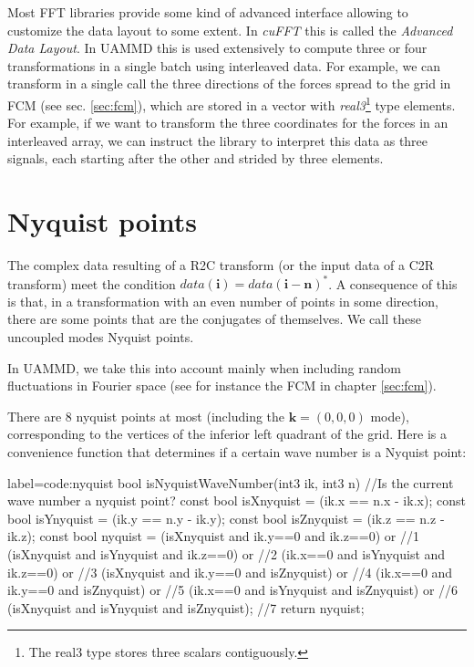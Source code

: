 \documentclass[twoside,openright,titlepage,numbers=noenddot,%
headinclude,footinclude,cleardoublepage=empty,abstract=on,
BCOR=5mm,fontsize=11pt, dvipsnames, paper=b5
]{scrreprt}
\renewcommand{\vec}[1]{\bm{#1}}
\newcommand{\uammd}{\gls{UAMMD}\xspace}
\begin{document}
Most \gls{FFT} libraries provide some kind of advanced interface allowing to customize the data layout to some extent. In \emph{cuFFT} this is called the \emph{Advanced Data Layout}. In \uammd this is used extensively to compute three or four transformations in a single batch using interleaved data. For example, we can transform in a single call the three directions of the forces spread to the grid in \gls{FCM} (see sec. \ref{sec:fcm}), which are stored in a vector with \emph{real3}\footnote{The real3 type stores three scalars contiguously.} type elements.
For example, if we want to transform the three coordinates for the forces in an interleaved array, we can instruct the library to interpret this data as three signals, each starting after the other and strided by three elements.
\section*{Nyquist points}
The complex data resulting of a R2C transform (or the input data of a C2R transform) meet the condition $data(\vec{i}) = data(\vec{i} - \vec{n})^*$. A consequence of this is that, in a transformation with an even number of points in some direction, there are some points that are the conjugates of themselves. We call these uncoupled modes Nyquist points.

In \uammd, we take this into account mainly when including random fluctuations in Fourier space (see for instance the \gls{FCM} in chapter \ref{sec:fcm}).

There are $8$ nyquist points at most (including the $\vec{k} = (0,0,0)$ mode), corresponding to the vertices of the inferior left quadrant of the grid.
Here is a convenience function that determines if a certain wave number is a Nyquist point:
\begin{code2}{label=code:nyquist}  
bool isNyquistWaveNumber(int3 ik, int3 n){
  //Is the current wave number a nyquist point?
  const bool isXnyquist = (ik.x == n.x - ik.x);
  const bool isYnyquist = (ik.y == n.y - ik.y);
  const bool isZnyquist = (ik.z == n.z - ik.z);
  const bool nyquist =  
    (isXnyquist and ik.y==0    and ik.z==0)    or //1
    (isXnyquist and isYnyquist and ik.z==0)    or //2
    (ik.x==0    and isYnyquist and ik.z==0)    or //3
    (isXnyquist and ik.y==0    and isZnyquist) or //4
    (ik.x==0    and ik.y==0    and isZnyquist) or //5
    (ik.x==0    and isYnyquist and isZnyquist) or //6
    (isXnyquist and isYnyquist and isZnyquist);   //7
  return nyquist;
}
\end{code2}
\end{document}
